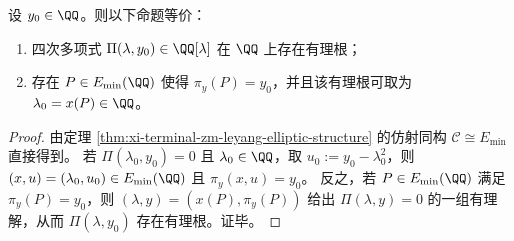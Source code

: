 \begin{corollary}\label{cor:xi-terminal-zm-pi-rational-root-specialization-elliptic-image}
设 \(y_0\in\QQ\)。则以下命题等价：
\begin{enumerate}
  \item 四次多项式 \(\Pi(\lambda,y_0)\in\QQ[\lambda]\) 在 \(\QQ\) 上存在有理根；
  \item 存在 \(P\in E_{\min}(\QQ)\) 使得 \(\pi_y(P)=y_0\)，并且该有理根可取为 \(\lambda_0=x(P)\in\QQ\)。
\end{enumerate}
\end{corollary}
\begin{proof}
由定理 \ref{thm:xi-terminal-zm-leyang-elliptic-structure} 的仿射同构 \(\mathcal C\cong E_{\min}\) 直接得到。
若 \(\Pi(\lambda_0,y_0)=0\) 且 \(\lambda_0\in\QQ\)，取 \(u_0:=y_0-\lambda_0^2\)，则 \((x,u)=(\lambda_0,u_0)\in E_{\min}(\QQ)\) 且 \(\pi_y(x,u)=y_0\)。
反之，若 \(P\in E_{\min}(\QQ)\) 满足 \(\pi_y(P)=y_0\)，则 \((\lambda,y)=(x(P),\pi_y(P))\) 给出 \(\Pi(\lambda,y)=0\) 的一组有理解，从而 \(\Pi(\lambda,y_0)\) 存在有理根。证毕。
\end{proof}

